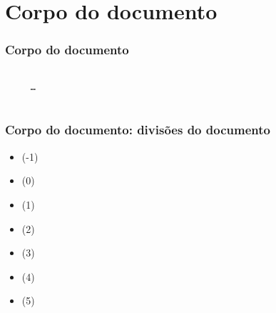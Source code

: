 \section{Corpo do documento}

\begin{frame}[fragile]
  \frametitle{Corpo do documento}
  \begin{verbatim}
    
     …
    
  \end{verbatim}
\end{frame}

\begin{frame}[fragile]
  \frametitle{Corpo do documento: divisões do documento}
  \large
  \begin{multicols}{2}
    \begin{itemize}
      \item\latexcode{\part} (-1)
      \item\latexcode{\chapter} (0)
      \item\latexcode{\section} (1)
      \item\latexcode{\subsection} (2)
      \item\latexcode{\subsubsection} (3)
      \item\latexcode{\paragraph} (4)
      \item\latexcode{\subparagraph} (5)
    \end{itemize}
  \end{multicols}
\end{frame}

